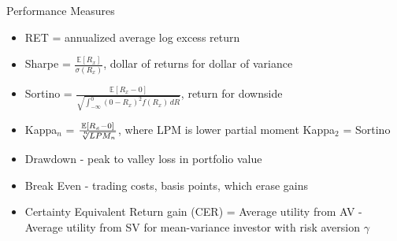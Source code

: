 \documentclass{beamer}
\begin{document}
\begin{frame}{Performance Measures}
	\begin{itemize}[<+->]
		\item RET = annualized average log excess return
		\item Sharpe = $\frac{\mathbb{E}[R_{x}]}{\sigma(R_{x})}$, dollar of returns for dollar of variance
		\item Sortino = $\frac{\mathbb{E}[R_{x} - 0]}{\sqrt  {\int _{{-\infty }}^{0}(0-R_{x})^{2}f(R_{x})\,dR}}$, return for downside
		\item Kappa$_{n}$ = $\frac{\mathbb{E}[R_{x} - 0]}{\sqrt[\leftroot{-2}\uproot{2}n]{LPM_{n}}}$, where LPM is lower partial moment Kappa$_{2}$ = Sortino
		\item Drawdown - peak to valley loss in portfolio value
		\item Break Even - trading costs, basis points, which erase gains
		\item Certainty Equivalent Return gain (CER) = Average utility from AV - Average utility from SV for mean-variance investor with risk aversion $\gamma$
	\end{itemize}
\end{frame}

%		
\end{document}
